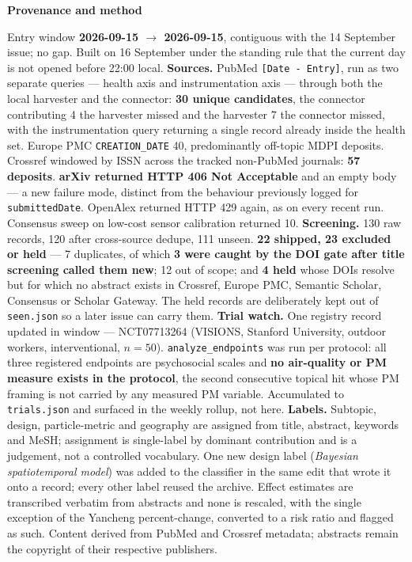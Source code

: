 \documentclass[10pt]{article}
\begin{document}
\vspace{4mm}
\begin{keybox}
{\sffamily\bfseries\footnotesize\color{Deep}Provenance and method}\\[1.2mm]
{\fontsize{7.2}{8.8}\selectfont
Entry window \textbf{2026-09-15 $\to$ 2026-09-15}, contiguous with the 14 September issue;
no gap. Built on 16 September under the standing rule that the current day is not opened
before 22:00 local.
\textbf{Sources.} PubMed \texttt{[Date - Entry]}, run as two separate queries --- health
axis and instrumentation axis --- through both the local harvester and the connector:
\textbf{30 unique candidates}, the connector contributing 4 the harvester missed and the
harvester 7 the connector missed, with the instrumentation query returning a single record
already inside the health set. Europe PMC \texttt{CREATION\_DATE} 40, predominantly
off-topic MDPI deposits. Crossref windowed by ISSN across the tracked non-PubMed journals:
\textbf{57 deposits}. \textbf{arXiv returned HTTP 406 Not Acceptable} and an empty body ---
a new failure mode, distinct from the behaviour previously logged for
\texttt{submittedDate}. OpenAlex returned HTTP 429 again, as on every recent run. Consensus
sweep on low-cost sensor calibration returned 10.
\textbf{Screening.} 130 raw records, 120 after cross-source dedupe, 111 unseen.
\textbf{22 shipped, 23 excluded or held} --- 7 duplicates, of which \textbf{3 were caught
by the DOI gate after title screening called them new}; 12 out of scope; and \textbf{4
held} whose DOIs resolve but for which no abstract exists in Crossref, Europe PMC,
Semantic Scholar, Consensus or Scholar Gateway. The held records are deliberately kept out
of \texttt{seen.json} so a later issue can carry them.
\textbf{Trial watch.} One registry record updated in window --- NCT07713264 (VISIONS,
Stanford University, outdoor workers, interventional, $n=50$). \texttt{analyze\_endpoints}
was run per protocol: all three registered endpoints are psychosocial scales and
\textbf{no air-quality or PM measure exists in the protocol}, the second consecutive
topical hit whose PM framing is not carried by any measured PM variable. Accumulated to
\texttt{trials.json} and surfaced in the weekly rollup, not here.
\textbf{Labels.} Subtopic, design, particle-metric and geography are assigned from title,
abstract, keywords and MeSH; assignment is single-label by dominant contribution and is a
judgement, not a controlled vocabulary. One new design label
(\textit{Bayesian spatiotemporal model}) was added to the classifier in the same edit that
wrote it onto a record; every other label reused the archive.
Effect estimates are transcribed verbatim from abstracts and none is rescaled, with the
single exception of the Yancheng percent-change, converted to a risk ratio and flagged as
such.
Content derived from PubMed and Crossref metadata; abstracts remain the copyright of their
respective publishers.\par}
\end{keybox}
\end{document}
